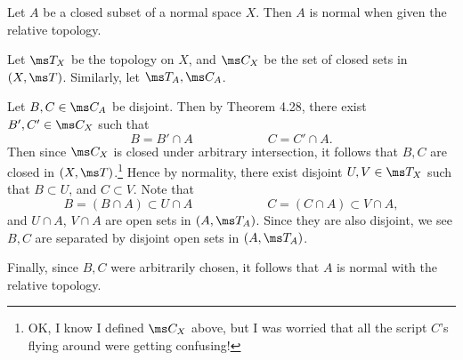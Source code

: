 \documentclass{fkpset}
\begin{document}
  \begin{problem}[5.23]
    Let $A$ be a closed subset of a normal space $X$. Then $A$ is
    normal when given the relative topology.
  \end{problem}
  \begin{solution}
    Let $\ms T_X$ be the topology on $X$, and $\ms C_X$ be the set of
    closed sets in $(X,\ms T)$. Similarly, let $\ms T_A, \ms C_A$.

    Let $B,C \in \ms C_A$ be disjoint. Then by Theorem 4.28, there
    exist $B', C' \in \ms C_X$ such that
    \[
      B = B' \cap A \qquad \qquad \qquad C = C' \cap A.
    \]
    Then since $\ms C_X$ is closed under arbitrary intersection, it
    follows that $B, C$ are closed in $(X, \ms T)$.\footnote{OK, I
      know I defined $\ms C_X$ above, but I was worried that all the
      script $C$'s flying around were getting confusing!} Hence by
    normality, there exist disjoint $U,V \in \ms T_X$ such that $B
    \subset U$, and $C \subset V$. Note that
    \[
      B = (B \cap A) \subset U \cap A \qquad \qquad \qquad C = (C \cap
      A) \subset V \cap A,
    \]
    and $U \cap A$, $V \cap A$ are open sets in $(A, \ms T_A)$. Since
    they are also disjoint, we see $B,C$ are separated by disjoint
    open sets in $(A, \ms T_A)$.

    Finally, since $B,C$ were arbitrarily chosen, it follows that $A$
    is normal with the relative topology.
  \end{solution}
\end{document}
